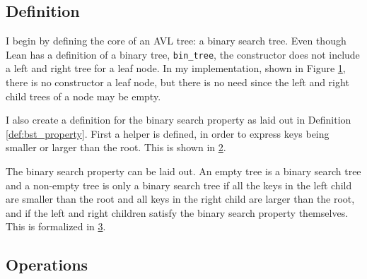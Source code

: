 \subsection*{Definition}

I begin by defining the core of an AVL tree: a binary search tree. Even though Lean has a definition of a binary tree, \lstinline{bin_tree}, the constructor does not include a left and right tree for a leaf node.
In my implementation, shown in Figure \ref{lst:btree}, there is no constructor a leaf node, but there is no need since the left and right child trees of a node may be empty.

\begin{figure}[!ht]
  \centering
  
  \caption{}
  \label{lst:btree}
\end{figure}

I also create a definition for the binary search property as laid out in Definition \ref{def:bst_property}. First a helper is defined, 
in order to express keys being smaller or larger than the root. This is shown in \ref{lst:forall_keys}.

\begin{figure}[!ht]
  \centering
  
  \caption{}
  \label{lst:forall_keys}
\end{figure}

The binary search property can be laid out. An empty tree is a binary search tree  and a non-empty tree is only a binary search tree if all the keys
in the left child are smaller than the root and all keys in the right child are larger than the root, and if the left and right children satisfy the binary search property themselves.
This is formalized in \ref{lst:ordered}.


\begin{figure}[!ht]
  \centering
  
  \caption{}
  \label{lst:ordered}
\end{figure}

\subsection*{Operations}

